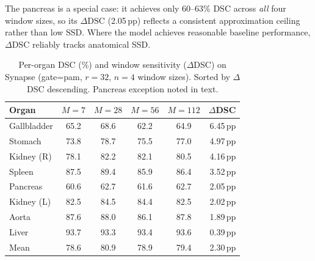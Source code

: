 The pancreas is a special case: it achieves only 60--63\% DSC across \emph{all} four window sizes, so its $\Delta\text{DSC}$ (2.05\,pp) reflects a consistent approximation ceiling rather than low SSD. Where the model achieves reasonable baseline performance, $\Delta\text{DSC}$ reliably tracks anatomical SSD.

\begin{table}[tb]
  \caption{Per-organ DSC (\%) and window sensitivity ($\Delta$DSC) on Synapse (gate=pam, $r{=}32$, $n{=}4$ window sizes). Sorted by $\Delta$DSC descending. Pancreas exception noted in text.}
  \label{tab:per_organ}
  \centering
  \setlength{\tabcolsep}{5pt}
  \begin{tabular}{lccccr}
    \toprule
    Organ & $M{=}7$ & $M{=}28$ & $M{=}56$ & $M{=}112$ & $\Delta$DSC \\
    \midrule
    Gallbladder & 65.2 & 68.6 & 62.2 & 64.9 & 6.45\,pp \\
    Stomach     & 73.8 & 78.7 & 75.5 & 77.0 & 4.97\,pp \\
    Kidney (R)  & 78.1 & 82.2 & 82.1 & 80.5 & 4.16\,pp \\
    Spleen      & 87.5 & 89.4 & 85.9 & 86.4 & 3.52\,pp \\
    Pancreas    & 60.6 & 62.7 & 61.6 & 62.7 & 2.05\,pp \\
    Kidney (L)  & 82.5 & 84.5 & 84.4 & 82.5 & 2.02\,pp \\
    Aorta       & 87.6 & 88.0 & 86.1 & 87.8 & 1.89\,pp \\
    Liver       & 93.7 & 93.3 & 93.4 & 93.6 & 0.39\,pp \\
    \midrule
    Mean        & 78.6 & 80.9 & 78.9 & 79.4 & 2.30\,pp \\
    \bottomrule
  \end{tabular}
\end{table}

